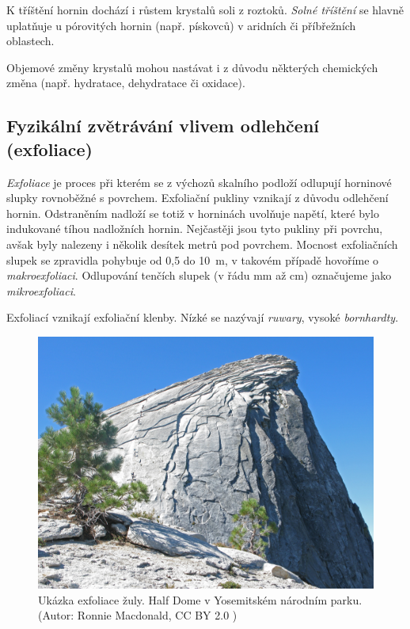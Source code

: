 K tříštění hornin dochází i růstem krystalů soli z roztoků. \emph{Solné tříštění} se hlavně uplatňuje u pórovitých hornin (např. pískovců) v aridních či příbřežních oblastech.

Objemové změny krystalů mohou nastávat i z důvodu některých chemických změna (např. hydratace, dehydratace či oxidace).

\subsection{Fyzikální zvětrávání vlivem odlehčení (exfoliace)}
\emph{Exfoliace} je proces při kterém se z výchozů skalního podloží odlupují horninové slupky rovnoběžné s povrchem. Exfoliační pukliny vznikají z důvodu odlehčení hornin. Odstraněním nadloží se totiž v horninách uvolňuje napětí, které bylo indukované tíhou nadložních hornin. Nejčastěji jsou tyto pukliny při povrchu, avšak byly nalezeny i několik desítek metrů pod povrchem.
Mocnost exfoliačních slupek se zpravidla pohybuje od 0,5 do \SI{10}{\metre}, v takovém případě hovoříme o \emph{makroexfoliaci}. Odlupování tenčích slupek (v řádu \si{mm} až \si{cm}) označujeme jako \emph{mikroexfoliaci}.

Exfoliací vznikají exfoliační klenby. Nízké se nazývají \emph{ruwary}, vysoké \emph{bornhardty}.

\begin{figure}[h]
	\centering
	\includegraphics[width=1\linewidth]{obrazky/zvetravani/exfoliace}
	\caption{Ukázka exfoliace žuly. Half Dome v Yosemitském národním parku. (Autor: Ronnie Macdonald, CC BY 2.0 )}
	\label{fig:exfoliace}
\end{figure}


